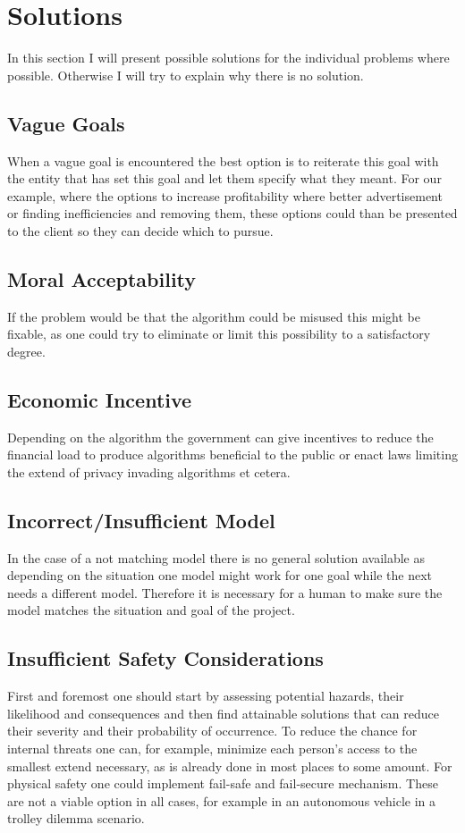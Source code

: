 \section{Solutions}
In this section I will present possible solutions
for the individual problems where possible. Otherwise I will try to explain why there is no solution.

\subsection{Vague Goals}
When a vague goal is encountered the best option is to reiterate this goal with the entity that has set this goal and let them specify what they meant. For our example, where the options to increase profitability where better advertisement or finding inefficiencies and removing them, these options could than be presented to the client so they can decide which to pursue.


\subsection{Moral Acceptability}
If the problem would be that the algorithm could be misused
this might be fixable, as one could try to eliminate or limit this possibility to a satisfactory degree.

\subsection{Economic Incentive}
Depending on the algorithm the government can give incentives to reduce the financial load to produce algorithms beneficial to the public or enact laws limiting the extend of privacy invading algorithms et cetera.


\subsection{Incorrect/Insufficient Model}
In the case of a not matching model there is no general solution
available as depending on the situation one model might work for one goal 
while the next needs a different model. Therefore it is necessary for a human to make sure the model matches the situation and goal of the project.


\subsection{Insufficient Safety Considerations}
First and foremost one should start by assessing potential hazards, their likelihood and consequences and then find attainable solutions that can reduce their severity and their probability of occurrence. To reduce the chance for internal threats one can, for example, minimize each person's access to the smallest extend necessary, as is already done in most places to some amount. For physical safety one could implement fail-safe and fail-secure mechanism. These are not a viable option in all cases, for example in an autonomous vehicle in a trolley dilemma scenario.

